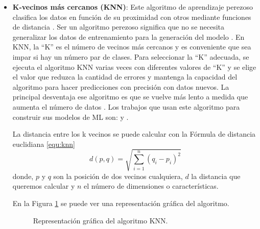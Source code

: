 \begin{itemize}
\item \textbf{K-vecinos más cercanos (\gls{KNN})}: Este algoritmo de aprendizaje perezoso clasifica los datos en función de su proximidad con otros mediante funciones de distancia \cite{136}. Ser un algoritmo perezoso significa que no se necesita generalizar los datos de entrenamiento para la generación del modelo \cite{137}. En \gls{KNN}, la ``K'' es el número de vecinos más cercanos y es conveniente que sea impar si hay un número par de clases. Para seleccionar la ``K'' adecuada, se ejecuta el algoritmo \gls{KNN} varias veces con diferentes valores de ``K'' y se elige el valor que reduzca la cantidad de errores y mantenga la capacidad del algoritmo para hacer predicciones con precisión con datos nuevos. La principal desventaja ese algoritmo es que se vuelve más lento a medida que aumenta el número de datos \cite{135}. Los trabajos que usan este algoritmo para construir sus modelos de \gls{ML} son: \cite{shallow} y \cite{detecting}.

La distancia entre los k vecinos se puede calcular con la Fórmula de distancia euclidiana \ref{equ:knn} \cite{143}
\begin{equation}\label{equ:knn}
d(p,q) = \sqrt{\sum_{i=1}^{n} (q_i - p_i)^2}
\end{equation}
\noindent donde, $p$ y $q$ son la posición de dos vecinos cualquiera, $d$ la distancia que queremos calcular y $n$ el número de dimensiones o características.

En la Figura \ref{fig:knn} se puede ver una representación gráfica del algoritmo.

\begin{figure}[h!]
\begin{center}
{}
\end{center}
\caption{Representación gráfica del algoritmo KNN.}
\label{fig:knn}
\end{figure}


\end{itemize}
